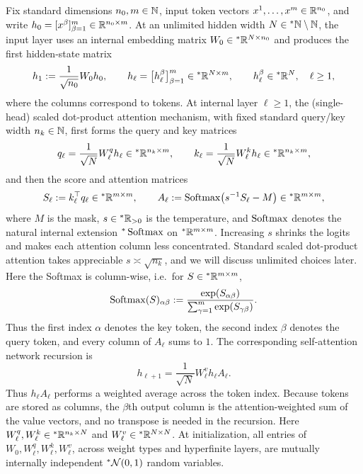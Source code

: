 Fix standard dimensions $n_0, m \in \mathbb{N}$, input token vectors $x^1, \dots, x^m \in \mathbb{R}^{n_0}$, and write $h_0 = [x^\beta]_{\beta=1}^m \in \mathbb{R}^{n_0 \times m}$. At an unlimited hidden width $N \in {}^*\mathbb{N} \setminus \mathbb{N}$, the input layer uses an internal embedding matrix $W_0 \in {}^*\mathbb{R}^{N \times n_0}$ and produces the first hidden-state matrix
\begin{equation}
\label{eq:ch6-attn-embed}
h_1 := \frac{1}{\sqrt{n_0}} W_0 h_0, \qquad
h_\ell = \bigl[h_\ell^\beta\bigr]_{\beta=1}^m \in {}^*\mathbb{R}^{N \times m}, \qquad
h_\ell^\beta \in {}^*\mathbb{R}^N, \quad \ell \ge 1,
\end{equation}
where the columns correspond to tokens. At internal layer $\ell \ge 1$, the (single-head) scaled dot-product attention mechanism, with fixed standard query/key width $n_k \in \mathbb{N}$, first forms the query and key matrices
\begin{equation}
\label{eq:ch6-qk}
q_\ell = \frac{1}{\sqrt{N}} W_\ell^q h_\ell \in {}^*\mathbb{R}^{n_k \times m}, \qquad
k_\ell = \frac{1}{\sqrt{N}} W_\ell^k h_\ell \in {}^*\mathbb{R}^{n_k \times m},
\end{equation}
and then the score and attention matrices
\begin{equation}
\label{eq:ch6-score-attn}
S_\ell := k_\ell^\top q_\ell \in {}^*\mathbb{R}^{m \times m}, \qquad
A_\ell := \operatorname{Softmax}\bigl(s^{-1} S_\ell - M\bigr) \in {}^*\mathbb{R}^{m \times m},
\end{equation}
where $M$ is the mask, $s \in {}^*\mathbb{R}_{>0}$ is the temperature, and $\operatorname{Softmax}$ denotes the natural internal extension ${}^*\operatorname{Softmax}$ on ${}^*\mathbb{R}^{m \times m}$. Increasing $s$ shrinks the logits and makes each attention column less concentrated. Standard scaled dot-product attention takes appreciable $s \asymp \sqrt{n_k}$, and we will discuss unlimited choices later. Here the Softmax is column-wise, i.e.\ for $S \in {}^*\mathbb{R}^{m \times m}$,
\begin{equation}
\label{eq:ch6-softmax-def}
\operatorname{Softmax}(S)_{\alpha\beta} := \frac{\exp(S_{\alpha\beta})}{\sum_{\gamma=1}^m \exp(S_{\gamma\beta})}.
\end{equation}
Thus the first index $\alpha$ denotes the key token, the second index $\beta$ denotes the query token, and every column of $A_\ell$ sums to $1$. The corresponding self-attention network recursion is
\begin{equation}
\label{eq:ch6-attn-rec}
h_{\ell+1} = \frac{1}{\sqrt{N}} W_\ell^v h_\ell A_\ell.
\end{equation}
Thus $h_\ell A_\ell$ performs a weighted average across the token index. Because tokens are stored as columns, the $\beta$th output column is the attention-weighted sum of the value vectors, and no transpose is needed in the recursion. Here $W_\ell^q, W_\ell^k \in {}^*\mathbb{R}^{n_k \times N}$ and $W_\ell^v \in {}^*\mathbb{R}^{N \times N}$. At initialization, all entries of $W_0, W_\ell^q, W_\ell^k, W_\ell^v$, across weight types and hyperfinite layers, are mutually internally independent ${}^*\mathcal{N}(0, 1)$ random variables.

